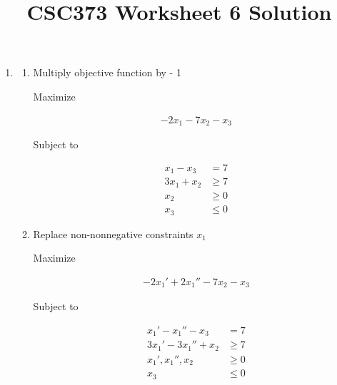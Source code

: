 \documentclass[12pt]{article}
\begin{document}
\title{CSC373 Worksheet 6 Solution}
\maketitle

\bigskip

\begin{enumerate}[1.]
    \item

    \begin{enumerate}[1.]
        \item Multiply objective function by - 1

        \bigskip

        \begin{mdframed}

        Maximize

        \begin{align*}
            -2x_1 - 7x_2 - x_3
        \end{align*}

        Subject to

        \begin{align*}
            x_1 - x_3  &= 7\\
            3x_1 + x_2 &\geq 7\\
            x_2 &\geq 0\\
            x_3 &\leq 0
        \end{align*}

        \end{mdframed}

        \item Replace non-nonnegative constraints $x_1$

        \begin{mdframed}

        Maximize

        \begin{align*}
            -2x_1' + 2x_1'' - 7x_2 - x_3
        \end{align*}

        Subject to

        \begin{align*}
            x_1' - x_1'' - x_3  &= 7\\
            3x_1' - 3x_1'' + x_2 &\geq 7\\
            x_1', x_1'', x_2 &\geq 0\\
            x_3 &\leq 0
        \end{align*}


\end{mdframed}
\end{enumerate}
\end{enumerate}
\end{document}
